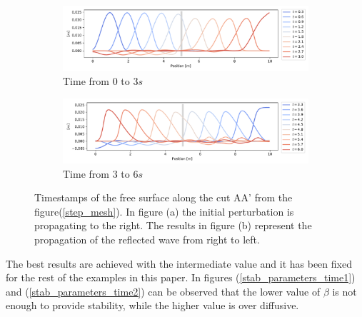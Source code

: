 \documentclass[a4paper,12pt]{article}
\begin{document}
\begin{figure}[H]
\begin{subfigure}{\textwidth}
    \centering
    \includegraphics[width=\textwidth]{img/step/free_surface_1.pdf}
    \caption{Time from $0$ to $3s$}
\end{subfigure}
\begin{subfigure}{\textwidth}
    \centering
    \includegraphics[width=\textwidth]{img/step/free_surface_2.pdf}
    \caption{Time from $3$ to $6s$}
\end{subfigure}
\caption{Timestamps of the free surface along the cut AA' from the figure(\ref{step_mesh}). In figure (a) the initial perturbation is propagating to the right. The results in figure (b) represent the propagation of the reflected wave from right to left.}
\label{waves_propagation}
\end{figure}


The best results are achieved with the intermediate value and it has been fixed for the rest of the examples in this paper.
In figures (\ref{stab_parameters_time1}) and (\ref{stab_parameters_time2}) can be observed that the lower value of $\beta$ is not enough to provide stability, while the higher value is over diffusive.
\end{document}
